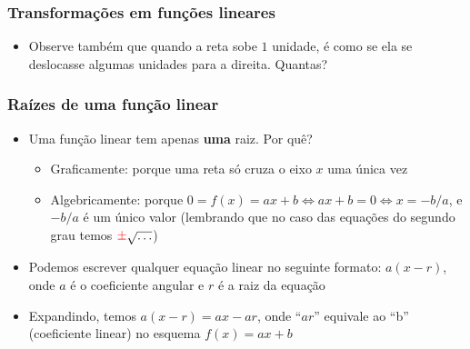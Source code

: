 \documentclass[usenames,dvipsnames,svgnames]{beamer}
\begin{document}
\begin{frame}
	\frametitle{Transformações em funções lineares}

	\begin{itemize}
		\item Observe também que quando a reta sobe $1$ unidade, é como se ela se deslocasse algumas unidades para a direita. Quantas?
	\end{itemize}

	\begin{adjustbox}{max totalsize={\textwidth}{.6\textheight},center}
	\end{adjustbox}
\end{frame}

\begin{frame}
	\frametitle{Raízes de uma função linear}

	\begin{itemize}
		\item Uma função linear tem apenas \textbf{uma} raiz. Por quê?
		\begin{itemize}
			\item Graficamente: porque uma reta só cruza o eixo $x$ uma única vez
			\item Algebricamente: porque $0 = f(x) = ax + b \Leftrightarrow ax + b = 0 \Leftrightarrow x = -b/a$, e $-b/a$ é um único valor (lembrando que no caso das equações do segundo grau temos ${\color{red}\pm} \sqrt{\dots}$)
		\end{itemize}
		\item Podemos escrever qualquer equação linear no seguinte formato: $a(x-r)$, onde $a$ é o coeficiente angular e $r$ é a raiz da equação
		\item Expandindo, temos $a(x-r) = ax - ar$, onde ``$ar$'' equivale ao ``b'' (coeficiente linear) no esquema $f(x) = ax + b$
	\end{itemize}
\end{frame}
\end{document}
